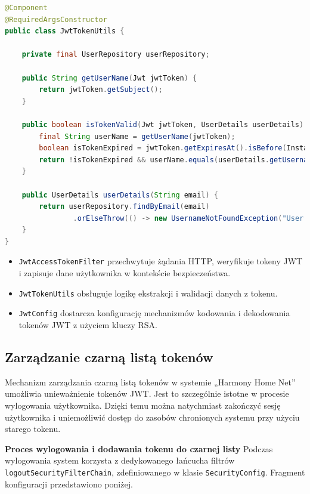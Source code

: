 \begin{lstlisting}[language=Java, style=JavaStyle, caption=Klasa \texttt{JwtTokenUtils}]
@Component
@RequiredArgsConstructor
public class JwtTokenUtils {

    private final UserRepository userRepository;

    public String getUserName(Jwt jwtToken) {
        return jwtToken.getSubject();
    }

    public boolean isTokenValid(Jwt jwtToken, UserDetails userDetails) {
        final String userName = getUserName(jwtToken);
        boolean isTokenExpired = jwtToken.getExpiresAt().isBefore(Instant.now());
        return !isTokenExpired && userName.equals(userDetails.getUsername());
    }

    public UserDetails userDetails(String email) {
        return userRepository.findByEmail(email)
                .orElseThrow(() -> new UsernameNotFoundException("User not found"));
    }
}
\end{lstlisting}

\begin{itemize}
    \item \texttt{JwtAccessTokenFilter} przechwytuje żądania HTTP, weryfikuje tokeny JWT i zapisuje dane użytkownika w kontekście bezpieczeństwa.
    \item \texttt{JwtTokenUtils} obsługuje logikę ekstrakcji i walidacji danych z tokenu.
    \item \texttt{JwtConfig} dostarcza konfigurację mechanizmów kodowania i dekodowania tokenów JWT z użyciem kluczy RSA.
\end{itemize}


\subsection{Zarządzanie czarną listą tokenów}

Mechanizm zarządzania czarną listą tokenów w systemie „Harmony Home Net” umożliwia unieważnienie tokenów JWT. Jest to szczególnie istotne w procesie wylogowania użytkownika. Dzięki temu można natychmiast zakończyć sesję użytkownika i uniemożliwić dostęp do zasobów chronionych systemu przy użyciu starego tokenu.

\noindent \textbf{Proces wylogowania i dodawania tokenu do czarnej listy}\newline
Podczas wylogowania system korzysta z dedykowanego łańcucha filtrów \texttt{logoutSecurityFilterChain}, zdefiniowanego w klasie \texttt{SecurityConfig}. Fragment konfiguracji przedstawiono poniżej.

